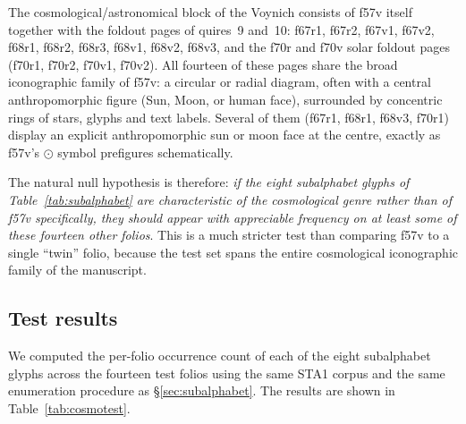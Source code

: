 The cosmological/astronomical block of the Voynich consists of f57v itself
together with the foldout pages of quires~9 and~10: f67r1, f67r2, f67v1,
f67v2, f68r1, f68r2, f68r3, f68v1, f68v2, f68v3, and the f70r and f70v solar
foldout pages (f70r1, f70r2, f70v1, f70v2). All fourteen of these pages share
the broad iconographic family of f57v: a circular or radial diagram, often
with a central anthropomorphic figure (Sun, Moon, or human face), surrounded
by concentric rings of stars, glyphs and text labels. Several of them
(f67r1, f68r1, f68v3, f70r1) display an explicit anthropomorphic sun or moon
face at the centre, exactly as f57v's $\odot$ symbol prefigures schematically.

The natural null hypothesis is therefore: \emph{if the eight subalphabet
glyphs of Table~\ref{tab:subalphabet} are characteristic of the cosmological
genre rather than of f57v specifically, they should appear with appreciable
frequency on at least some of these fourteen other folios}. This is a much
stricter test than comparing f57v to a single ``twin'' folio, because the
test set spans the entire cosmological iconographic family of the manuscript.

\subsection{Test results}
\label{sec:test_results}

We computed the per-folio occurrence count of each of the eight subalphabet
glyphs across the fourteen test folios using the same STA1 corpus and the
same enumeration procedure as \S\ref{sec:subalphabet}. The results are shown
in Table~\ref{tab:cosmotest}.

